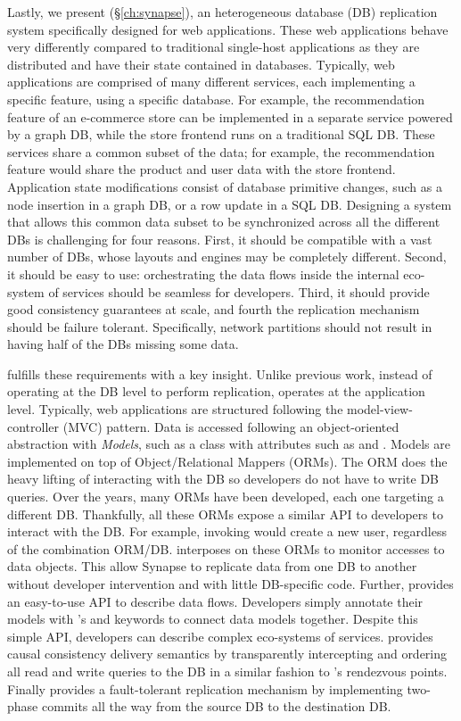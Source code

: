 Lastly, we present \synapse (\S\ref{ch:synapse}), an heterogeneous database (DB)
replication system specifically designed for web applications. These web
applications behave very differently compared to traditional single-host
applications as they are distributed and have their state contained in
databases. Typically, web applications are comprised of many different
services, each implementing a specific feature, using a specific database.
For example, the recommendation feature of an e-commerce store can be
implemented in a separate service powered by a graph DB, while the store
frontend runs on a traditional SQL DB. These services share a common subset
of the data; for example, the recommendation feature would share the product
and user data with the store frontend.
Application state modifications consist of database primitive changes, such as a
node insertion in a graph DB, or a row update in a SQL DB. 
Designing a system that allows this common data subset to be synchronized across
all the different DBs is challenging for four reasons. First, it should be
compatible with a vast number of DBs, whose layouts and engines may be
completely different. Second, it should be easy to use: orchestrating the data
flows inside the internal eco-system of services should be seamless for developers.
Third, it should provide good consistency guarantees at scale, and fourth
the replication mechanism should be failure tolerant. Specifically, network partitions
should not result in having half of the DBs missing some data.

\synapse fulfills these requirements with a key insight. Unlike previous work,
instead of operating at the DB level to perform replication, \synapse operates
at the application level. Typically, web applications are structured following
the model-view-controller (MVC) pattern. Data is accessed following an object-oriented
abstraction with {\em Models}, such as a  class with attributes such
as  and . Models are implemented on top of Object/Relational Mappers (ORMs).
The ORM does the heavy lifting of interacting with the DB so developers
do not have to write DB queries. Over the years, many ORMs have been developed,
each one targeting a different DB. Thankfully, all these ORMs expose a similar API
to developers to interact with the DB. For example, invoking
 would create a new user, regardless of the combination
ORM/DB.  \synapse interposes on these ORMs to monitor accesses to data objects.
This allow Synapse to replicate data from
one DB to another without developer intervention and with little DB-specific code.
Further, \synapse provides an easy-to-use API to describe data flows. Developers simply
annotate their models with \synapse's  and 
keywords to connect data models together.
Despite this simple API, developers can describe complex eco-systems
of services. \synapse provides causal consistency delivery semantics by
transparently intercepting and ordering all read and write queries to the DB in
a similar fashion to \scribe's rendezvous points. Finally \synapse provides
a fault-tolerant replication mechanism by implementing two-phase commits all
the way from the source DB to the destination DB.

